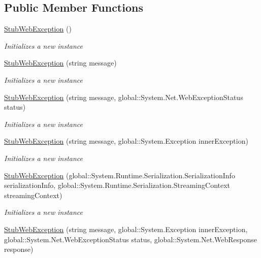 \subsection*{Public Member Functions}
\begin{DoxyCompactItemize}
\item 
\hyperlink{class_system_1_1_net_1_1_fakes_1_1_stub_web_exception_aa009956f5a34d93a1f437d657089b07c}{Stub\-Web\-Exception} ()
\begin{DoxyCompactList}\small\item\em Initializes a new instance\end{DoxyCompactList}\item 
\hyperlink{class_system_1_1_net_1_1_fakes_1_1_stub_web_exception_a3c455b978997e906e5bd8bad9caab49b}{Stub\-Web\-Exception} (string message)
\begin{DoxyCompactList}\small\item\em Initializes a new instance\end{DoxyCompactList}\item 
\hyperlink{class_system_1_1_net_1_1_fakes_1_1_stub_web_exception_a9031af1a9353a1c821eff2081319e9e4}{Stub\-Web\-Exception} (string message, global\-::\-System.\-Net.\-Web\-Exception\-Status status)
\begin{DoxyCompactList}\small\item\em Initializes a new instance\end{DoxyCompactList}\item 
\hyperlink{class_system_1_1_net_1_1_fakes_1_1_stub_web_exception_a7a2ae5c4cd5a81d00855cce5f7593ec7}{Stub\-Web\-Exception} (string message, global\-::\-System.\-Exception inner\-Exception)
\begin{DoxyCompactList}\small\item\em Initializes a new instance\end{DoxyCompactList}\item 
\hyperlink{class_system_1_1_net_1_1_fakes_1_1_stub_web_exception_a9178c2842e6f1c800d33745fe70aaf81}{Stub\-Web\-Exception} (global\-::\-System.\-Runtime.\-Serialization.\-Serialization\-Info serialization\-Info, global\-::\-System.\-Runtime.\-Serialization.\-Streaming\-Context streaming\-Context)
\begin{DoxyCompactList}\small\item\em Initializes a new instance\end{DoxyCompactList}\item 
\hyperlink{class_system_1_1_net_1_1_fakes_1_1_stub_web_exception_a2f374c39ac6d0c001a66a1d7aea7fea9}{Stub\-Web\-Exception} (string message, global\-::\-System.\-Exception inner\-Exception, global\-::\-System.\-Net.\-Web\-Exception\-Status status, global\-::\-System.\-Net.\-Web\-Response response)

\end{DoxyCompactItemize}
